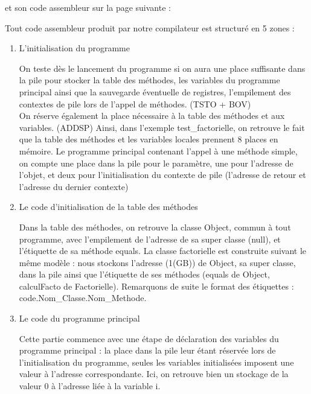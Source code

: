 \documentclass[11pt]{article}
\begin{document}
et son code assembleur sur la page suivante : 


\newpage
   Tout code assembleur produit par notre compilateur est structuré en 5 zones : 
\begin{enumerate}
\item L'initialisation du programme

\hspace{1cm} On teste dès le lancement du programme si on aura une place suffisante dans la pile pour stocker la table des méthodes, les variables du programme principal ainsi que la sauvegarde éventuelle de registres, l'empilement des contextes de pile lors de l'appel de méthodes. (TSTO + BOV)\\
\hspace{1cm} On réserve également la place nécessaire à la table des méthodes et aux variables. (ADDSP)
Ainsi, dans l'exemple test\_factorielle, on retrouve le fait que la table des méthodes et les variables locales prennent 8 places en mémoire.
Le programme principal contenant l'appel à une méthode simple, on compte une place dans la pile pour le paramètre, une pour l'adresse de l'objet, et deux pour l'initialisation du contexte de pile (l'adresse de retour et l'adresse du dernier contexte) \\

\item Le code d'initialisation de la table des méthodes

\hspace{1cm} Dans la table des méthodes, on retrouve la classe Object, commun à tout programme, avec l'empilement de l'adresse de sa super classe (null), et l'étiquette de sa méthode equals. La classe factorielle est construite suivant le même modèle : nous stockons l'adresse (1(GB)) de Object, sa super classe, dans la pile ainsi que l'étiquette de ses méthodes (equals de Object, calculFacto de Factorielle). Remarquons de suite le format des étiquettes : code.Nom\_Classe.Nom\_Methode. \\

\item Le code du programme principal

\hspace{1cm} Cette partie commence avec une étape de déclaration des variables du programme principal : la place dans la pile leur étant réservée lors de l'initialisation du programme, seules les variables initialisées imposent une valeur à l'adresse correspondante. Ici, on retrouve bien un stockage de la valeur 0 à l'adresse liée à la variable i.


\end{enumerate}
\end{document}
